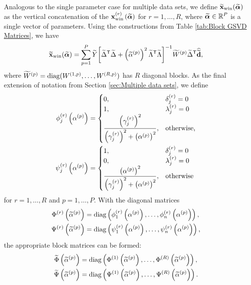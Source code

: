 \documentclass[12pt]{article}
\begin{document}
Analogous to the single parameter case for multiple data sets, we define $\widetilde{\mathbf{x}}_{\text{win}}(\widetilde{\bm{\alpha}})$ as the vertical concatenation of the $\mathbf{x}_{\text{win}}^{(r)}\left(\widetilde{\bm{\alpha}}\right)$ for $r = 1,\ldots,R$, where $\widetilde{\bm{\alpha}} \in \mathbb{R}^P$ is a single vector of parameters. Using the constructions from Table \ref{tab:Block GSVD Matrices}, we have
\begin{equation}
\label{eq:Big Windowed Solution}
    \widetilde{\mathbf{x}}_{\text{win}}(\widetilde{\bm{\alpha}}) = \sum_{p=1}^{P} \widetilde{Y}{\left[{\widetilde{\Delta}}^\mathsf{T}\widetilde{\Delta} + \left(\widetilde{\alpha}^{(p)}\right)^2 {\widetilde{\Lambda}}^\mathsf{T}\widetilde{\Lambda}\right]}^{-1}\widetilde{W}^{(p)}{\widetilde{\Delta}}^\mathsf{T}\widehat{\widetilde{\mathbf{d}}},
\end{equation}
where $\widetilde{W}^{(p)} = \operatorname{diag}(W^{(1,p)},\ldots,W^{(R,p)})$ has $R$ diagonal blocks. As the final extension of notation from Section \ref{sec:Multiple data sets}, we define
\begin{align*}
    \phi_j^{(r)}\left(\alpha^{(p)}\right) &= \begin{cases}
0, & \delta_j^{(r)} = 0 \\
1, & \lambda_j^{(r)} = 0 \\
\dfrac{\left(\gamma_j^{(r)}\right)^2}{\left(\gamma_j^{(r)}\right)^2 + \left(\alpha^{(p)}\right)^2}, & \text{otherwise,}
\end{cases} \\
\psi_j^{(r)}\left(\alpha^{(p)}\right) &= \begin{cases}
1, & \delta_j^{(r)} = 0 \\
0, & \lambda_j^{(r)} = 0 \\
\dfrac{\left(\alpha^{(p)}\right)^2}{\left(\gamma_j^{(r)}\right)^2 + \left(\alpha^{(p)}\right)^2}, & \text{otherwise}
\end{cases}
\end{align*}
for $r = 1,\ldots,R$ and $p = 1,\ldots,P$. With the diagonal matrices
\begin{align*}
    \Phi^{(r)}\left(\widetilde{\alpha}^{(p)}\right) &= \operatorname{diag}\left(\phi_1^{(r)}\left(\alpha^{(p)}\right),\ldots,\phi_n^{(r)}\left(\alpha^{(p)}\right)\right), \\ \Psi^{(r)}\left(\widetilde{\alpha}^{(p)}\right) &= \operatorname{diag}\left(\psi_1^{(r)}\left(\alpha^{(p)}\right),\ldots,\psi_n^{(r)}\left(\alpha^{(p)}\right)\right),
\end{align*}
the appropriate block matrices can be formed:
\begin{align*}
    \widetilde{\Phi}\left(\widetilde{\alpha}^{(p)}\right) &= \operatorname{diag}\left(\Phi^{(1)}\left(\widetilde{\alpha}^{(p)}\right),\ldots,\Phi^{(R)}\left(\widetilde{\alpha}^{(p)}\right)\right), \\ \widetilde{\Psi}\left(\widetilde{\alpha}^{(p)}\right) &= \operatorname{diag}\left(\Psi^{(1)}\left(\widetilde{\alpha}^{(p)}\right),\ldots,\Psi^{(R)}\left(\widetilde{\alpha}^{(p)}\right)\right).
\end{align*}
\end{document}
